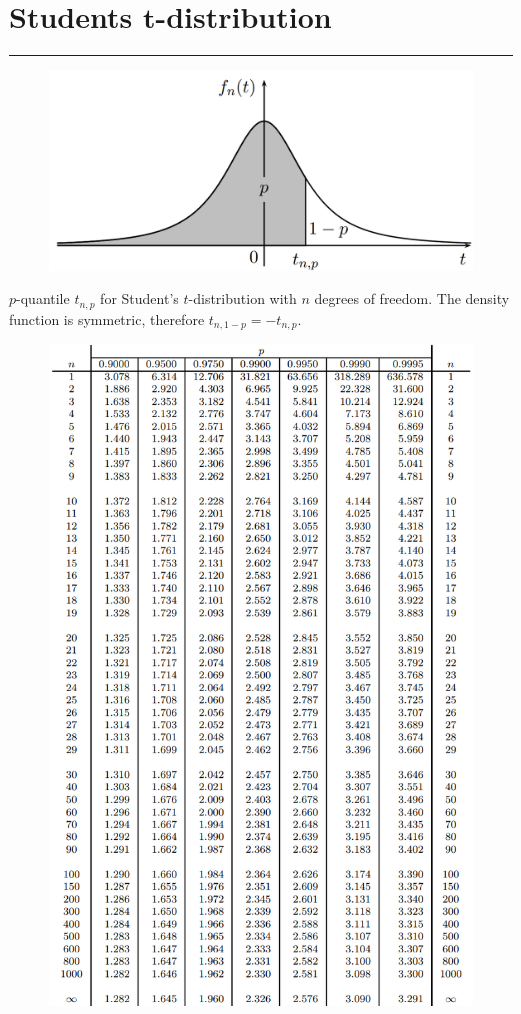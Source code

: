\section{Students $\mathbf{t}$-distribution}
\noindent\rule[\linienAbstand]{\linewidth}{\linienDickeDick}
\begin{figure}[H]
  \centering
  \includegraphics[width=.7\linewidth]{Pics/T.3.img.png}
\end{figure}
$p$-quantile $t_{n,p}$ for Student’s $t$-distribution with $n$ degrees of freedom. The density function is symmetric, therefore $t_{n,1-p} = -t_{n,p}$.
\begin{figure}[H]
  \centering
  \includegraphics[width=\linewidth]{Pics/T.3.png}
\end{figure}
\vfill\null

